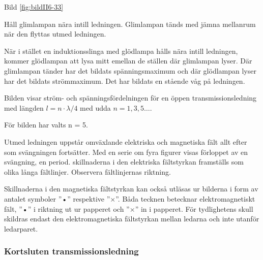 Bild \ref{fig:bildII6-33}

Håll glimlampan nära intill ledningen.  Glimlampan tänds med jämna
mellanrum när den flyttas utmed ledningen.

När i stället en induktionsslinga med glödlampa hålls nära intill
ledningen, kommer glödlampan att lysa mitt emellan de ställen där
glimlampan lyser. Där glimlampan tänder har det bildats
spänningsmaximum och där glödlampan lyser har det bildats
strömmaximum. Det har bildats en stående våg på ledningen.

Bilden visar ström- och spänningsfördelningen för en öppen
transmissionsledning med längden \(l = n\cdot\lambda/4\) med udda \(n
= 1, 3, 5 \dots\).

För bilden har valts n = 5.

Utmed ledningen uppstår omväxlande elektriska och magnetiska fält allt
efter som svängningen fortsätter. Med en serie om fyra figurer visas
förloppet av en svängning, en period. skillnaderna i den elektriska
fältstyrkan framställs som olika långa fältlinjer.  Observera
fältlinjernas riktning.

Skillnaderna i den magnetiska fältstyrkan kan också utläsas ur
bilderna i form av antalet symboler ''•'' respektive
''\(\times\)''. Båda tecknen betecknar elektromagnetiskt fält, ''•'' i
riktning ut ur papperet och ''\(\times\)'' in i papperet. För
tydlighetens skull skildras endast den elektromagnetiska fältstyrkan
mellan ledarna och inte utanför ledarparet.

\subsubsection{Kortsluten transmissionsledning}


